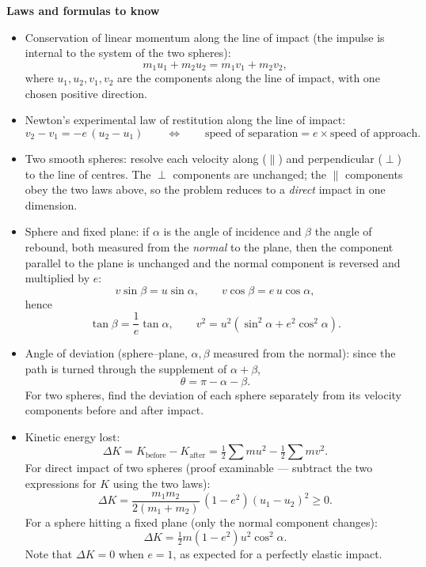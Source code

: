 \documentclass[11pt]{article}
\newcommand{\cle}[1]{{\popxbold\color{popdark}#1}}
\begin{document}
\begin{bilan}
\textbf{Laws and formulas to know}
\begin{itemize}
\item \cle{Conservation of linear momentum} along the line of impact (the impulse is internal to the system of the two spheres):
\[ m_1u_1+m_2u_2=m_1v_1+m_2v_2, \]
where $u_1,u_2,v_1,v_2$ are the components along the line of impact, with one chosen positive direction.
\item \cle{Newton's experimental law of restitution} along the line of impact:
\[ v_2-v_1=-e\,(u_2-u_1)\qquad\Longleftrightarrow\qquad \text{speed of separation}=e\times\text{speed of approach}. \]
\item \cle{Two smooth spheres}: resolve each velocity along ($\parallel$) and perpendicular ($\perp$) to the line of centres. The $\perp$ components are unchanged; the $\parallel$ components obey the two laws above, so the problem reduces to a \emph{direct} impact in one dimension.
\item \cle{Sphere and fixed plane}: if $\alpha$ is the angle of incidence and $\beta$ the angle of rebound, both measured from the \emph{normal} to the plane, then the component parallel to the plane is unchanged and the normal component is reversed and multiplied by $e$:
\[ v\sin\beta=u\sin\alpha,\qquad v\cos\beta=e\,u\cos\alpha, \]
hence
\[ \tan\beta=\frac{1}{e}\tan\alpha,\qquad v^2=u^2\!\left(\sin^2\alpha+e^2\cos^2\alpha\right). \]
\item \cle{Angle of deviation} (sphere--plane, $\alpha,\beta$ measured from the normal): since the path is turned through the supplement of $\alpha+\beta$,
\[ \theta=\pi-\alpha-\beta. \]
For two spheres, find the deviation of each sphere separately from its velocity components before and after impact.
\item \cle{Kinetic energy lost}:
\[ \Delta K=K_{\text{before}}-K_{\text{after}}=\tfrac12\sum mu^2-\tfrac12\sum mv^2. \]
For direct impact of two spheres (proof examinable --- subtract the two expressions for $K$ using the two laws):
\[ \Delta K=\frac{m_1m_2}{2(m_1+m_2)}\,(1-e^2)(u_1-u_2)^2\ge 0. \]
For a sphere hitting a fixed plane (only the normal component changes):
\[ \Delta K=\tfrac12 m(1-e^2)u^2\cos^2\alpha. \]
Note that $\Delta K=0$ when $e=1$, as expected for a perfectly elastic impact.
\end{itemize}


\end{bilan}
\end{document}
